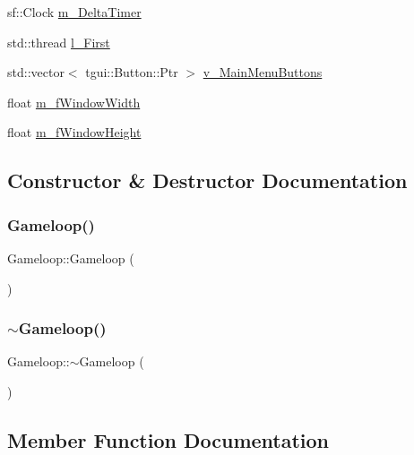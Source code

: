\begin{DoxyCompactItemize}
\item 
sf\+::\+Clock \mbox{\hyperlink{class_gameloop_afab858e560227b167ab322d434ccf9e9}{m\+\_\+\+Delta\+Timer}}
\item 
std\+::thread \mbox{\hyperlink{class_gameloop_ad57f3b4c4ca7ebd5c08e37a03ec7c820}{l\+\_\+\+First}}
\item 
std\+::vector$<$ tgui\+::\+Button\+::\+Ptr $>$ \mbox{\hyperlink{class_gameloop_aa9a5171b1ec266ee56d8369062848bbc}{v\+\_\+\+Main\+Menu\+Buttons}}
\item 
float \mbox{\hyperlink{class_gameloop_a0b53e1d8923bc8e5e7d05a6522d4a713}{m\+\_\+f\+Window\+Width}}
\item 
float \mbox{\hyperlink{class_gameloop_aa4432f8c0b80f2426716ee6f0271826d}{m\+\_\+f\+Window\+Height}}
\end{DoxyCompactItemize}


\subsection{Constructor \& Destructor Documentation}
\mbox{\label{class_gameloop_a18f9a1686565e206b40718ed787aeb97}} 
\subsubsection{\texorpdfstring{Gameloop()}{Gameloop()}}
{\footnotesize\ttfamily Gameloop\+::\+Gameloop (\begin{DoxyParamCaption}{ }\end{DoxyParamCaption})}

\mbox{\label{class_gameloop_ac0aff9533f00b23557a7d7b348b95007}} 
\subsubsection{\texorpdfstring{$\sim$\+Gameloop()}{~Gameloop()}}
{\footnotesize\ttfamily Gameloop\+::$\sim$\+Gameloop (\begin{DoxyParamCaption}{ }\end{DoxyParamCaption})}



\subsection{Member Function Documentation}
\mbox{\label{class_gameloop_a72364d9b616a3d5b8372045586bf9f7e}} 

